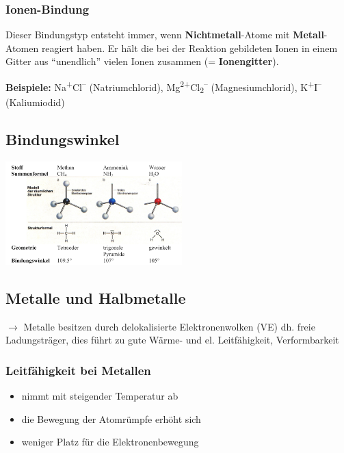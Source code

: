 \subsubsection{Ionen-Bindung}

Dieser Bindungstyp entsteht immer, wenn \textbf{Nichtmetall}-Atome mit \textbf{Metall}-Atomen reagiert haben. Er hält die bei der Reaktion gebildeten Ionen in einem Gitter aus ``unendlich'' vielen Ionen zusammen (= \textbf{Ionengitter}).

\textbf{Beispiele:} Na\textsuperscript{+}Cl\textsuperscript{--} (Natriumchlorid), Mg\textsuperscript{2+}Cl\textsubscript{2}\textsuperscript{--} (Magnesiumchlorid), K\textsuperscript{+}I\textsuperscript{--} (Kaliumiodid)


\subsection{Bindungswinkel}
\begin{center}
	\includegraphics[height=4cm]{images/Winkel.png}
\end{center}

\subsection{Metalle und Halbmetalle}
 $\rightarrow$ Metalle besitzen durch delokalisierte Elektronenwolken (VE) dh. freie Ladungsträger, dies führt zu gute Wärme- und el. Leitfähigkeit, Verformbarkeit
\subsubsection {Leitfähigkeit bei Metallen}
	\begin{itemize}
		\item nimmt mit steigender Temperatur ab
		\item die Bewegung der Atomrümpfe erhöht sich
		\item weniger Platz für die Elektronenbewegung
	\end{itemize}
	
